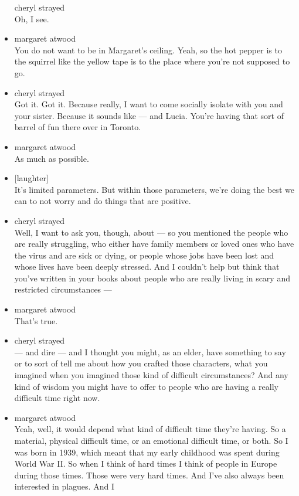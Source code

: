 \begin{itemize}
  cheryl strayed\\
  Oh, I see.
\item
  margaret atwood\\
  You do not want to be in Margaret's ceiling. Yeah, so the hot pepper
  is to the squirrel like the yellow tape is to the place where you're
  not supposed to go.
\item
  cheryl strayed\\
  Got it. Got it. Because really, I want to come socially isolate with
  you and your sister. Because it sounds like --- and Lucia. You're
  having that sort of barrel of fun there over in Toronto.
\item
  margaret atwood\\
  As much as possible.
\item
  {[}laughter{]}\\
  It's limited parameters. But within those parameters, we're doing the
  best we can to not worry and do things that are positive.
\item
  cheryl strayed\\
  Well, I want to ask you, though, about --- so you mentioned the people
  who are really struggling, who either have family members or loved
  ones who have the virus and are sick or dying, or people whose jobs
  have been lost and whose lives have been deeply stressed. And I
  couldn't help but think that you've written in your books about people
  who are really living in scary and restricted circumstances ---
\item
  margaret atwood\\
  That's true.
\item
  cheryl strayed\\
  --- and dire --- and I thought you might, as an elder, have something
  to say or to sort of tell me about how you crafted those characters,
  what you imagined when you imagined those kind of difficult
  circumstances? And any kind of wisdom you might have to offer to
  people who are having a really difficult time right now.
\item
  margaret atwood\\
  Yeah, well, it would depend what kind of difficult time they're
  having. So a material, physical difficult time, or an emotional
  difficult time, or both. So I was born in 1939, which meant that my
  early childhood was spent during World War II. So when I think of hard
  times I think of people in Europe during those times. Those were very
  hard times. And I've also always been interested in plagues. And I

\end{itemize}
